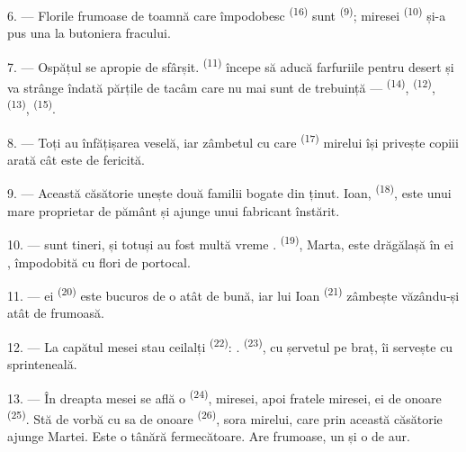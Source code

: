 6. --- Florile frumoase de toamnă care împodobesc 
\textsuperscript{(16)} sunt  \textsuperscript{(9)};
 miresei \textsuperscript{(10)} și-a pus una la butoniera fracului.

7. --- Ospățul se apropie de sfârșit. 
\textsuperscript{(11)} începe să aducă farfuriile pentru desert și va strânge
îndată părțile de tacâm care nu mai sunt de trebuință --- 
\textsuperscript{(14)},  \textsuperscript{(12)},
 \textsuperscript{(13)}, 
\textsuperscript{(15)}.

\VUsaut{3.0mm}

8. --- Toți au înfățișarea veselă, iar zâmbetul cu care 
\textsuperscript{(17)} mirelui își privește copiii arată cât este de fericită.

9. --- Această căsătorie unește două familii bogate din ținut. Ioan,
 \textsuperscript{(18)}, este  unui mare proprietar de
pământ și ajunge  unui fabricant înstărit.

10. ---  sunt tineri, și totuși au fost multă vreme
.  \textsuperscript{(19)}, Marta, este
drăgălașă în  ei , împodobită cu flori de portocal.

11. ---  ei \textsuperscript{(20)} este bucuros de o 
atât de bună, iar  lui Ioan \textsuperscript{(21)} zâmbește
văzându-și  atât de frumoasă.

12. --- La capătul mesei stau ceilalți  \textsuperscript{(22)}:
.  \textsuperscript{(23)}, cu
șervetul pe braț, îi servește cu sprinteneală.

\VUsaut{3.0mm}

13. --- În dreapta mesei se află o  \textsuperscript{(24)},
 miresei, apoi fratele miresei,  ei de onoare
\textsuperscript{(25)}. Stă de vorbă cu  sa de onoare
\textsuperscript{(26)}, sora mirelui, care prin această căsătorie ajunge
 Martei. Este o tânără fermecătoare. Are 
frumoase, un  și o  de aur.

